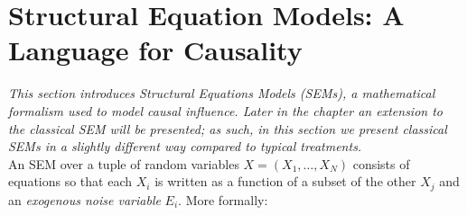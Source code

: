 






\section{Structural Equation Models: A Language for Causality}

\emph{This section introduces Structural Equations Models (SEMs), a mathematical formalism used to model causal influence. Later in the chapter an extension to the classical SEM will be presented; as such, in this section we present classical SEMs in a slightly different way compared to typical treatments.}
\\

\noindent An SEM over a tuple of random variables $X = (X_1, \ldots, X_N)$ consists of equations so that each $X_i$ is written as a function of a subset of the other $X_j$ and an \emph{exogenous noise variable} $E_i$. More formally:

